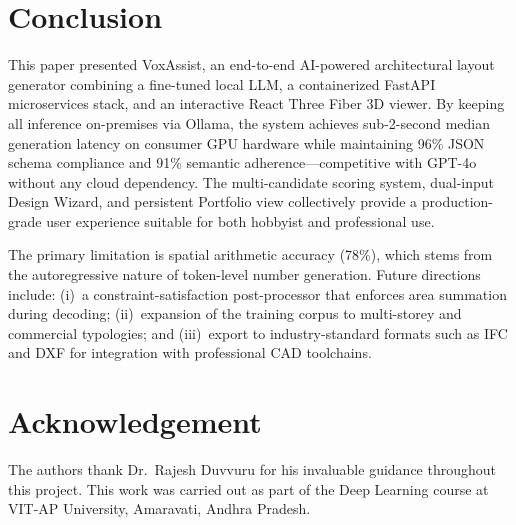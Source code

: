 \documentclass[12pt, a4paper]{article}
\begin{document}
\section{Conclusion}

This paper presented VoxAssist, an end-to-end AI-powered architectural layout
generator combining a fine-tuned local LLM, a containerized FastAPI
microservices stack, and an interactive React Three Fiber 3D viewer. By keeping
all inference on-premises via Ollama, the system achieves sub-2-second median
generation latency on consumer GPU hardware while maintaining 96\% JSON schema
compliance and 91\% semantic adherence---competitive with GPT-4o without any
cloud dependency. The multi-candidate scoring system, dual-input Design Wizard,
and persistent Portfolio view collectively provide a production-grade user
experience suitable for both hobbyist and professional use.

The primary limitation is spatial arithmetic accuracy (78\%), which stems from
the autoregressive nature of token-level number generation. Future directions
include: (i)~a constraint-satisfaction post-processor that enforces area
summation during decoding; (ii)~expansion of the training corpus to multi-storey
and commercial typologies; and (iii)~export to industry-standard formats such as
IFC and DXF for integration with professional CAD toolchains.

\section*{Acknowledgement}
The authors thank Dr.\ Rajesh Duvvuru for his invaluable guidance throughout this
project. This work was carried out as part of the Deep Learning course at
VIT-AP University, Amaravati, Andhra Pradesh.
\end{document}
